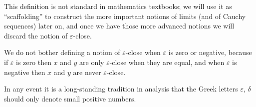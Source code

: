 \begin{remark}\label{4.3.5}
    This definition is not standard in mathematics textbooks;
    we will use it as ``scaffolding'' to construct the more important notions of limits (and of Cauchy sequences) later on, and once we have those more advanced notions we will discard the notion of \(\varepsilon\)-close.
\end{remark}

\begin{note}
    We do not bother defining a notion of \(\varepsilon\)-close when \(\varepsilon\) is zero or negative, because if \(\varepsilon\) is zero then \(x\) and \(y\) are only \(\varepsilon\)-close when they are equal, and when \(\varepsilon\) is negative then \(x\) and \(y\) are never \(\varepsilon\)-close.
\end{note}

\begin{note}
    In any event it is a long-standing tradition in analysis that the Greek letters \(\varepsilon\), \(\delta\) should only denote small positive numbers.
\end{note}


